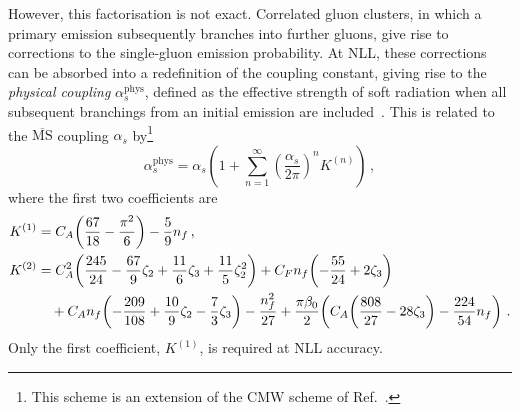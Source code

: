 However, this factorisation is not exact. Correlated gluon clusters, 
in which a primary emission subsequently branches into further gluons, 
give rise to corrections to the single-gluon emission probability. At
NLL, these corrections can be absorbed into a redefinition of the
coupling constant, giving rise to the \emph{physical coupling}
$\alpha_s^{\mathrm{phys}}$, defined as the effective strength of soft
radiation when all subsequent branchings from an initial emission are
included~\cite{Banfi:2018mcq}. This is related to the
$\overline{\mathrm{MS}}$ coupling $\alpha_s$
by\footnote{This scheme is an extension of the CMW scheme of
Ref.~\cite{Catani:1990rr}.} 
 \begin{equation} 
 \alpha_s^{\mathrm{phys}} = \alpha_s\left(1+\sum_{n=1}^\infty\left(\frac{\alpha_s}{2\pi} \right)^nK^{(n)}\right)\,,
\end{equation} 
where the first two coefficients are 
\begin{subequations}
\label{eq:alpha-phys-K}
\begin{align}
    K^{(1)} &= C_A\!\left(\frac{67}{18}-\frac{\pi^2}{6}\right)
               - \frac{5}{9}n_f\,, \\
    K^{(2)} &= C_A^2\!\left(\frac{245}{24} - \frac{67}{9}\zeta_2 
               + \frac{11}{6}\zeta_3 + \frac{11}{5}\zeta_2^2\right)
               + C_F n_f\!\left(-\frac{55}{24} + 2\zeta_3\right)
               \notag \\
             &\quad + C_A n_f\!\left(-\frac{209}{108} 
               + \frac{10}{9}\zeta_2 - \frac{7}{3}\zeta_3\right)
               - \frac{n_f^2}{27}
               + \frac{\pi\beta_0}{2}\!\left(
                 C_A\!\left(\frac{808}{27} - 28\zeta_3\right) 
                 - \frac{224}{54}n_f\right)\,.
\end{align}
\end{subequations}
Only the first coefficient, $K^{(1)}$, is required at NLL accuracy.

